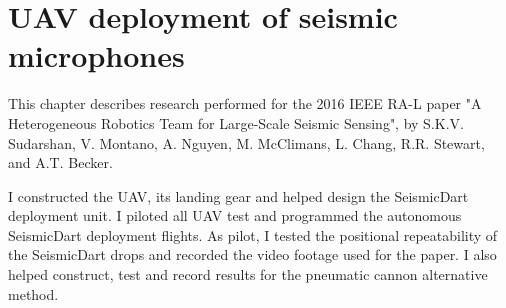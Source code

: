 \chapter[UAV Deploying SeismicDarts]{UAV deployment of seismic microphones}{\label{chap:SeismicDarts}}

This chapter describes research performed for the 2016 IEEE RA-L paper "A Heterogeneous Robotics Team for Large-Scale Seismic Sensing", by S.K.V. Sudarshan, V. Montano, A. Nguyen, M. McClimans, L. Chang, R.R. Stewart, and A.T. Becker. \cite{ral2016}

I constructed the UAV, its landing gear and helped design the SeismicDart deployment unit. I piloted all UAV test and programmed the autonomous SeismicDart deployment flights. As pilot, I tested the positional repeatability of the SeismicDart drops and recorded the video footage used for the paper. I also helped construct, test and record results for the pneumatic cannon alternative method.

